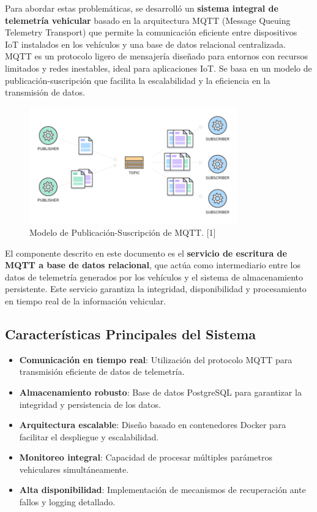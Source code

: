 Para abordar estas problemáticas, se desarrolló un \textbf{sistema integral de telemetría vehicular} basado en la arquitectura MQTT (Message Queuing Telemetry Transport) que permite la comunicación eficiente entre dispositivos IoT instalados en los vehículos y una base de datos relacional centralizada. MQTT es un protocolo ligero de mensajería diseñado para entornos con recursos limitados y redes inestables, ideal para aplicaciones IoT.
Se basa en un modelo de publicación-suscripción que facilita la escalabilidad y la eficiencia en la transmisión de datos.

\begin{figure}[h]
    \centering
    \includegraphics[width=0.8\textwidth]{Imagenes/2PubSub.png}
    \caption{Modelo de Publicación-Suscripción de MQTT. [1]}
    \label{fig:pubsub}
\end{figure}

El componente descrito en este documento es el \textbf{servicio de escritura de MQTT a base de datos relacional}, que actúa como intermediario entre los datos de telemetría generados por los vehículos y el sistema de almacenamiento persistente. Este servicio garantiza la integridad, disponibilidad y procesamiento en tiempo real de la información vehicular.

\subsection{Características Principales del Sistema}

\begin{itemize}[noitemsep]
    \item \textbf{Comunicación en tiempo real}: Utilización del protocolo MQTT para transmisión eficiente de datos de telemetría.
    \item \textbf{Almacenamiento robusto}: Base de datos PostgreSQL para garantizar la integridad y persistencia de los datos.
    \item \textbf{Arquitectura escalable}: Diseño basado en contenedores Docker para facilitar el despliegue y escalabilidad.
    \item \textbf{Monitoreo integral}: Capacidad de procesar múltiples parámetros vehiculares simultáneamente.
    \item \textbf{Alta disponibilidad}: Implementación de mecanismos de recuperación ante fallos y logging detallado.
\end{itemize}

